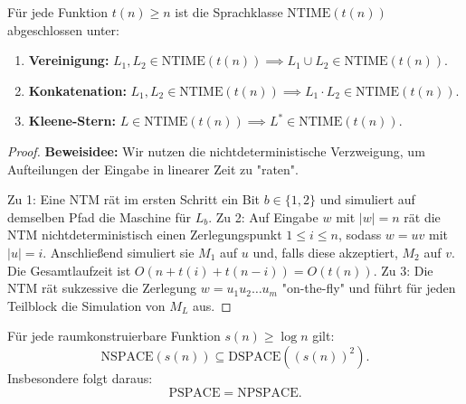 \begin{theorem}
    Für jede Funktion $t(n) \ge n$ ist die Sprachklasse $\mathrm{NTIME}(t(n))$ abgeschlossen unter:
    \begin{enumerate}
        \item \textbf{Vereinigung:} $L_1, L_2 \in \mathrm{NTIME}(t(n)) \implies L_1 \cup L_2 \in \mathrm{NTIME}(t(n))$.
        \item \textbf{Konkatenation:} $L_1, L_2 \in \mathrm{NTIME}(t(n)) \implies L_1 \cdot L_2 \in \mathrm{NTIME}(t(n))$.
        \item \textbf{Kleene-Stern:} $L \in \mathrm{NTIME}(t(n)) \implies L^* \in \mathrm{NTIME}(t(n))$.
    \end{enumerate}
\end{theorem}

\begin{proof}
    \textbf{Beweisidee:} Wir nutzen die nichtdeterministische Verzweigung, um Aufteilungen der Eingabe in linearer Zeit zu "raten".
    
    Zu 1: Eine NTM rät im ersten Schritt ein Bit $b \in \{1, 2\}$ und simuliert auf demselben Pfad die Maschine für $L_b$.
    Zu 2: Auf Eingabe $w$ mit $|w|=n$ rät die NTM nichtdeterministisch einen Zerlegungspunkt $1 \le i \le n$, sodass $w = u v$ mit $|u|=i$. Anschließend simuliert sie $M_1$ auf $u$ und, falls diese akzeptiert, $M_2$ auf $v$. Die Gesamtlaufzeit ist $O(n + t(i) + t(n-i)) = O(t(n))$.
    Zu 3: Die NTM rät sukzessive die Zerlegung $w = u_1 u_2 \dots u_m$ "on-the-fly" und führt für jeden Teilblock die Simulation von $M_L$ aus.
\end{proof}

\begin{theorem}
    Für jede raumkonstruierbare Funktion $s(n) \ge \log n$ gilt:
    \[
        \mathrm{NSPACE}(s(n)) \subseteq \mathrm{DSPACE}((s(n))^2).
    \]
    Insbesondere folgt daraus:
    \[
        \mathrm{PSPACE} = \mathrm{NPSPACE}.
    \]
\end{theorem}

